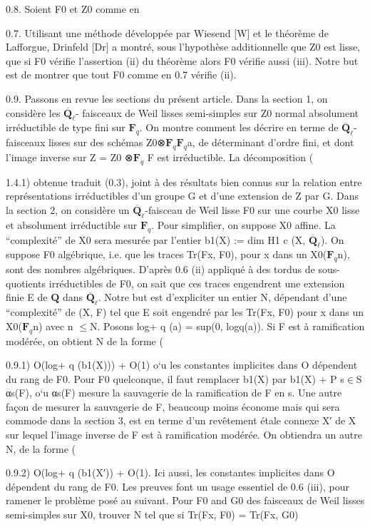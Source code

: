 \documentclass[11pt]{article}
\begin{document}
0.8. Soient F0 et Z0 comme en 

0.7. Utilisant une méthode développée par Wiesend [W] et le théorème de Lafforgue, Drinfeld [Dr] a montré, sous l’hypothèse additionnelle que Z0 est lisse, que si F0 vérifie l’assertion (ii) du théorème alors F0 vérifie aussi (iii). Notre but est de montrer que tout F0 comme en 0.7 vérifie (ii). 

0.9. Passons en revue les sections du présent article. Dans la section 1, on considère les \(\overline{\mathbf Q}_\ell\)- faisceaux de Weil lisses semi-simples sur Z0 normal absolument irréductible de type fini sur \(\mathbf F_q\). On montre comment les décrire en terme de \(\overline{\mathbf Q}_\ell\)-faisceaux lisses sur des schémas Z0⊗\(\mathbf F_q\)\(\mathbf F_q\)a, de déterminant d’ordre fini, et dont l’image inverse sur Z = Z0 ⊗\(\mathbf F_q\) F est irréductible. La décomposition (

1.4.1) obtenue traduit (0.3), joint à des résultats bien connus sur la relation entre représentations irréductibles d’un groupe G et d’une extension de Z par G. Dans la section 2, on considère un \(\overline{\mathbf Q}_\ell\)-faisceau de Weil lisse F0 sur une courbe X0 lisse et absolument irréductible sur \(\mathbf F_q\). Pour simplifier, on suppose X0 affine. La “complexité” de X0 sera mesurée par l’entier b1(X) := dim H1 c (X, \(\overline{\mathbf Q}_\ell\)). On suppose F0 algébrique, i.e. que les traces Tr(Fx, F0), pour x dans un X0(\(\mathbf F_q\)n), sont des nombres algébriques. D’après 0.6 (ii) appliqué à des tordus de sous-quotients irréductibles de F0, on sait que ces traces engendrent une extension finie E de \(\mathbf Q\) dans \(\overline{\mathbf Q}_\ell\). Notre but est d’expliciter un entier N, dépendant d’une “complexité” de (X, F) tel que E soit engendré par les Tr(Fx, F0) pour x dans un X0(\(\mathbf F_q\)n) avec n \(\le\)N. Posons log+ q (a) = sup(0, logq(a)). Si F est à ramification modérée, on obtient N de la forme (

0.9.1) O(log+ q (b1(X))) + O(1) o`u les constantes implicites dans O dépendent du rang de F0. Pour F0 quelconque, il faut remplacer b1(X) par b1(X) + P s\(\in\)S αs(F), o`u αs(F) mesure la sauvagerie de la ramification de F en s. Une autre façon de mesurer la sauvagerie de F, beaucoup moins économe mais qui sera commode dans la section 3, est en terme d’un revêtement étale connexe X′ de X sur lequel l’image inverse de F est à ramification modérée. On obtiendra un autre N, de la forme (

0.9.2) O(log+ q (b1(X′)) + O(1). Ici aussi, les constantes implicites dans O dépendent du rang de F0. Les preuves font un usage essentiel de 0.6 (iii), pour ramener le problème posé au suivant. Pour F0 and G0 des faisceaux de Weil lisses semi-simples sur X0, trouver N tel que si Tr(Fx, F0) = Tr(Fx, G0)
\end{document}
